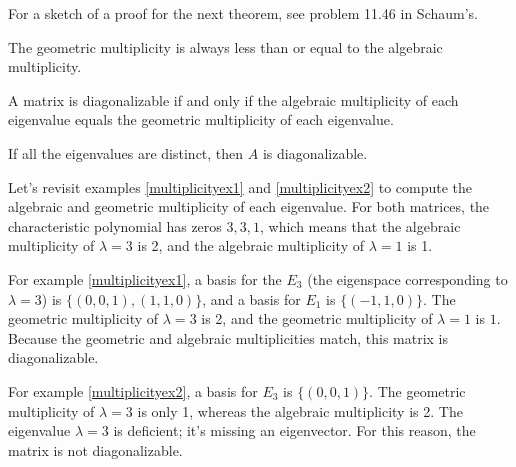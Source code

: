 For a sketch of a proof for the next theorem, see problem 11.46 in Schaum's.

\begin{theorem}
The geometric multiplicity is always less than or equal to the algebraic multiplicity.  
\end{theorem}

\begin{theorem}
A matrix is diagonalizable if and only if the algebraic multiplicity of each eigenvalue equals the geometric multiplicity of each eigenvalue. 
\end{theorem}


\begin{theorem}
If all the eigenvalues are distinct, then $A$ is diagonalizable.
\end{theorem}

\begin{example}
Let's revisit examples \ref{multiplicityex1} and  \ref{multiplicityex2} to compute the algebraic and geometric multiplicity of each eigenvalue.  For both matrices, the characteristic polynomial has zeros $3,3,1$, which means that the algebraic multiplicity of $\lambda=3$ is 2, and the algebraic multiplicity of $\lambda=1$ is 1. 

For example \ref{multiplicityex1},
a basis for the $E_3$ (the eigenspace corresponding to $\lambda = 3$) is $\{(0,0,1), (1,1,0)\}$, and a basis for $E_1$ is $\{(-1,1,0)\}$. The geometric multiplicity of $\lambda =3$ is 2, and the geometric multiplicity of $\lambda = 1$ is $1$.  Because the geometric and algebraic multiplicities match, this matrix is diagonalizable.

For example \ref{multiplicityex2}, a basis for $E_3$ is $\{(0,0,1)\}$. The geometric multiplicity of $\lambda = 3$ is only 1, whereas the algebraic multiplicity is 2. The eigenvalue $\lambda=3$ is deficient; it's missing an eigenvector.  For this reason, the matrix is not diagonalizable.
\end{example}


